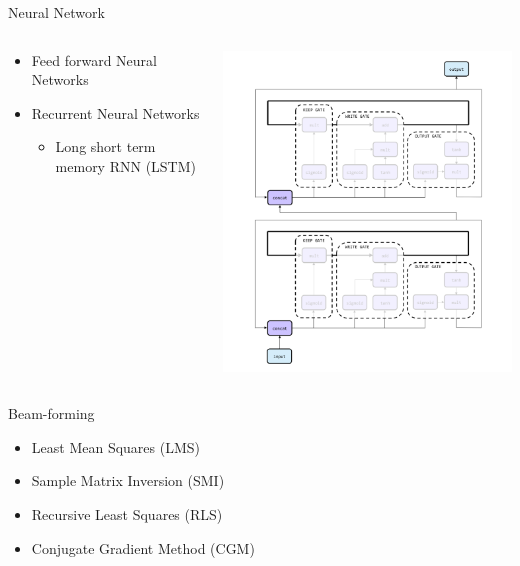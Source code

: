 \documentclass[10pt]{beamer}
\begin{document}
\begin{frame}{Neural Network}
\begin{columns}
\begin{column}{.4\textwidth}
\begin{itemize}[<+- | alert@+>]
    \item  Feed forward Neural Networks
    \item  Recurrent Neural Networks 
    \begin{itemize}
    \item Long short term memory RNN (LSTM)
    \end{itemize}
  \end{itemize}
  \end{column}
    \begin{column}{.5\textwidth}
\includegraphics[width=\textwidth]{src/lstmnet.png} 
\end{column}
  \end{columns}
\end{frame}
\begin{frame}{Beam-forming}
	\begin{itemize}
	\item Least Mean Squares (LMS)
	\item Sample Matrix Inversion (SMI)
	\item Recursive Least Squares (RLS)
	\item Conjugate Gradient Method (CGM)
	\end{itemize}
\end{frame}
\end{document}
